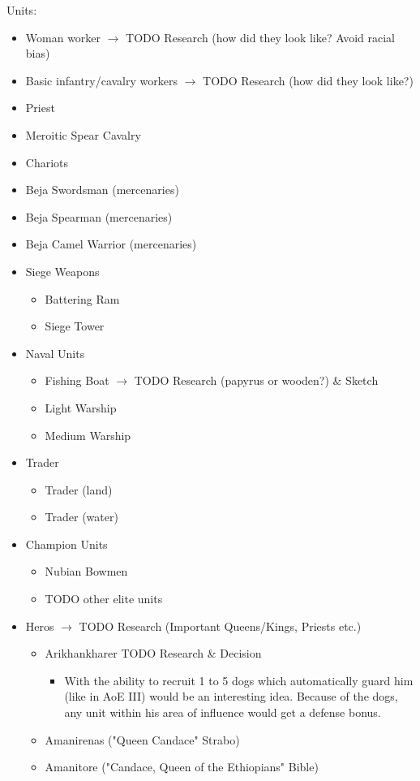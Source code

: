 \documentclass[a4paper,12pt]{scrreprt}
\begin{document}
Units:

\begin{itemize}
	\item Woman worker $\rightarrow$ TODO Research (how did they look like? Avoid racial bias)
	\item Basic infantry/cavalry workers $\rightarrow$ TODO Research (how did they look like?)
	\item Priest
	\item Meroitic Spear Cavalry
	\item Chariots
	\item Beja Swordsman (mercenaries)
	\item Beja Spearman (mercenaries)
	\item Beja Camel Warrior (mercenaries)
	\item Siege Weapons
	\begin{itemize}
		\item Battering Ram
		\item Siege Tower
	\end{itemize}
	\item Naval Units
	\begin{itemize}
		\item Fishing Boat $\rightarrow$ TODO Research (papyrus or wooden?) \& Sketch
		\item Light Warship
		\item Medium Warship
	\end{itemize}
	\item Trader
	\begin{itemize}
		\item Trader (land)
		\item Trader (water)
	\end{itemize}
	\item Champion Units
	\begin{itemize}
		\item Nubian Bowmen
		\item TODO other elite units
	\end{itemize}
	\item Heros $\rightarrow$ TODO Research (Important Queens/Kings, Priests etc.)
	\begin{itemize}
		\item Arikhankharer TODO Research \& Decision
		\begin{itemize}
			\item With the ability to recruit 1 to 5 dogs which automatically guard him (like in AoE III) would be an interesting idea. Because of the dogs, any unit within his area of influence would get a defense bonus.  
		\end{itemize}
		\item Amanirenas ("Queen Candace" Strabo)
		\item Amanitore ("Candace, Queen of the Ethiopians" Bible)
	\end{itemize}
\end{itemize}
\end{document}
